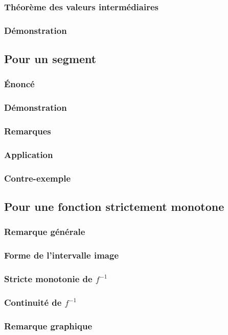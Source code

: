 \documentclass[12pt,a4paper,french]{book}
\begin{document}
			\subsubsection{Théorème des valeurs intermédiaires}
			\subsubsection{Démonstration}
		\subsection{Pour un segment}
			\subsubsection{Énoncé}
			\subsubsection{Démonstration}
			\subsubsection{Remarques}
			\subsubsection{Application}
			\subsubsection{Contre-exemple}
		\subsection{Pour une fonction strictement monotone}
			\subsubsection{Remarque générale}
			\subsubsection{Forme de l'intervalle image}
			\subsubsection{Stricte monotonie de $f^{-1}$}
			\subsubsection{Continuité de $f^{-1}$}
			\subsubsection{Remarque graphique}
\end{document}
